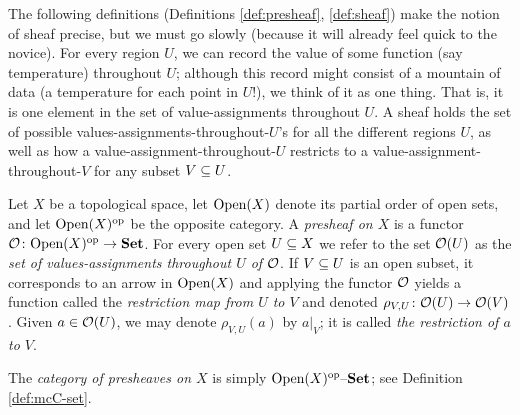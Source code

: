 \documentclass[CT4S-EN-RU]{subfiles}
\begin{document}
\begin{blockENG}
The following definitions (Definitions \ref{def:presheaf}, \ref{def:sheaf}) make the notion of sheaf precise, but we must go slowly (because it will already feel quick to the novice). For every region $U$, we can record the value of some function (say temperature) throughout $U$; although this record might consist of a mountain of data (a temperature for each point in $U$!), we think of it as one thing. That is, it is one element in the set of value-assignments throughout $U$. A sheaf holds the set of possible values-assignments-throughout-$U$'s for all the different regions $U$, as well as how a value-assignment-throughout-$U$ restricts to a value-assignment-throughout-$V$ for any subset $V\ss U$.
\end{blockENG}

\begin{blockRUS}
\end{blockRUS}

\begin{definitionENG}\label{def:presheaf}
Let $X$ be a topological space, let $\Op(X)$ denote its partial order of open sets, and let $\Op(X)\op$ be the opposite category. A {\em presheaf on $X$} is a functor $\mcO\taking\Op(X)\op\to\Set$. For every open set $U\ss X$ we refer to the set $\mcO(U)$ as the {\em set of values-assignments throughout $U$ of $\mcO$}. If $V\ss U$ is an open subset, it corresponds to an arrow in $\Op(X)$ and applying the functor $\mcO$ yields a function called the {\em restriction map from $U$ to $V$} and denoted $\rho_{V,U}\taking\mcO(U)\to\mcO(V)$. Given $a\in\mcO(U)$, we may denote $\rho_{V,U}(a)$ by $a|_V$; it is called {\em the restriction of $a$ to $V$}.

The {\em category of presheaves on $X$} is simply $\Op(X)\op\set$; see Definition \ref{def:mcC-set}.
\end{definitionENG}

\begin{definitionRUS}\label{def:presheaf}
\end{definitionRUS}
\end{document}
